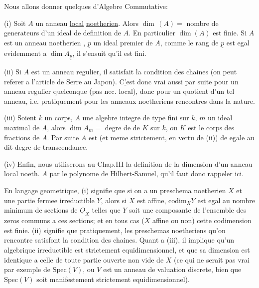 Nous allons donner quelques  d'Algebre Commutative:

(i) Soit $A$ un anneau \uline{local} \uline{noetherien}. Alors $\dim\,(A)={}$ nombre 
de generateurs d'un ideal de definition de $A$. En particulier $\dim(A)$
est finie. Si $A$  est un anneau noetherien , $\underline p$ un ideal premier
de $A$, comme le rang de $\underline p$ est egal evidemment a $\dim A_{\underline p}$, il
s'ensuit qu'il est fini.

(ii) Si $A$ est un anneau  regulier, il satisfait la condition
des chaines (on peut referer a l'article de Serre au Japon). C\uline{'}est donc
vrai aussi par suite pour un anneau regulier quelconque (pas nec.
local), donc pour un quotient d'un tel anneau, i.e. pratiquement pour
 les anneaux noetheriens rencontres dans la nature.

(iii) Soient $k$ un corps, $A$ une algebre integre de type fini sur $k$,
$m$ un ideal maximal de $A$, alors $\dim A_m={}$ degre de  de $K$ sur
$k$, ou $K$ est le corps des fractions de $A$. Par suite $A$ est 
(et meme strictement, en vertu de (ii)) de  egale au dit
degre de transcendance.

(iv) Enfin, nous utiliserons au Chap.III la definition de la dimension
d'un anneau local noeth. $A$ par le  polynome de Hilbert-Samuel,
qu'il faut donc rappeler ici.

En langage geometrique, (i) signifie que si on a un preschema
 noetherien $X$ et une partie fermee irreductible $Y$,
alors si $X$ est affine, $\mathrm{codim}_X Y$ est egal au nombre minimum de sections
de $\underline O_X$ telles que $Y$ soit une composante de l'ensemble des zeros communs
a ces sections; et en tous cas ($X$ affine ou non) cette codimension est
finie. (ii) signifie que pratiquement, les preschemas noetheriens
qu'on rencontre satisfont la condition des chaines. Quant a (iii), il
implique qu'un  algebrique irreductible est strictement
equidimensionnel, et que sa dimension est identique a celle de
toute partie ouverte non vide de $X$ (ce qui ne serait pas vrai par
exemple de $\mathrm{Spec}(V)$, ou $V$ est un anneau de valuation discrete, bien
que $\mathrm{Spec}(V)$ soit manifestement strictement equidimensionnel). 

